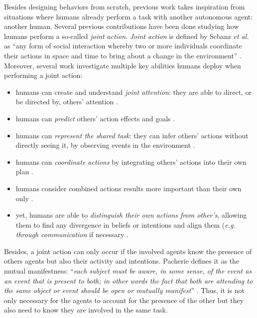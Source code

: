 \documentclass[a4paper,11pt,twoside]{StyleThese}
\begin{document}
Besides designing behaviors from scratch, previous work takes inspiration from situations where humans already perform a task with another autonomous agent: another human. Several previous contributions have been done studying how humans perform a so-called \textit{joint action}. \textit{Joint action} is defined by Sebanz \textit{et al.} as ``any form of social interaction whereby two or more individuals coordinate their actions in space and time to bring about a change in the environment'' \cite{sebanz2006joint}. Moreover, several work investigate multiple key abilities humans deploy when performing a joint action:
\begin{itemize}
\item humans can create and understand \textit{joint attention}: they are able to direct, or be directed by, others' attention \cite{pacherie_phenomenology_2011, sebanz2006joint}.
\item humans can \textit{predict} others' action effects and goals \cite{tomasello2005understanding, sebanz2006joint}.
\item humans can \textit{represent the shared task}: they can infer others' actions without directly seeing it, by observing events in the environment \cite{knoblich2011psychological, sebanz2006joint}.
\item humans can \textit{coordinate actions} by integrating others' actions into their own plan \cite{sebanz2006joint}.
\item humans consider combined actions results more important than their own only \cite{sebanz2006joint}.
\item yet, humans are able to \textit{distinguish their own actions from other's}, allowing them to find any divergence in beliefs or intentions and align them (\textit{e.g. through communication} if necessary \cite{pacherie_phenomenology_2011}.
\end{itemize}

Besides, a joint action can only occur if the involved agents know the presence of others agents but also their activity and intentions. Pacherie defines it as the mutual manifestness: ``\textit{each subject must be aware, in some sense, of the event as an event that is present to both; in other words the fact that both are attending to the same object or event should be open or mutually manifest}'' \cite{pacherie_phenomenology_2011}. Thus, it is not only necessary for the agents to account for the presence of the other but they also need to know they are involved in the same task.
\end{document}
